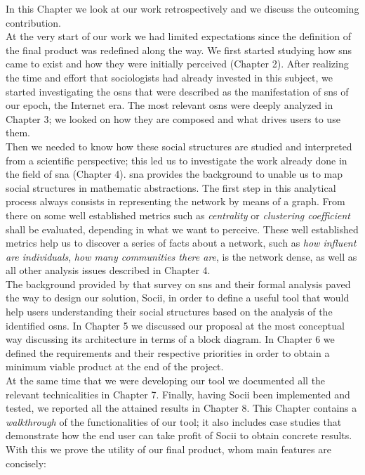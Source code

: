In this Chapter we look at our work retrospectively and we discuss the outcoming contribution.\\
\indent At the very start of our work we had limited expectations since the definition of the final product was redefined along the way. We first started studying how \glspl{sn} came to exist and how they were initially perceived (Chapter 2). After realizing the time and effort that sociologists had already invested in this subject, we started investigating the \glspl{osn} that were described as the manifestation of \glspl{sn} of our epoch, the Internet era. The most relevant \glspl{osn} were deeply analyzed in Chapter 3; we looked on how they are composed and what drives users to use them.\\
\indent Then we needed to know how these social structures are studied and interpreted from a scientific perspective; this led us to investigate the work already done in the field of \gls{sna} (Chapter 4). \gls{sna} provides the background to unable us to map social structures in mathematic abstractions. The first step in this analytical process always consists in representing the network by means of a graph. From there on some well established metrics such as \emph{centrality} or \emph{clustering coefficient} shall be evaluated, depending in what we want to perceive. These well established metrics help us to discover a series of facts about a network, such as \emph{how influent are individuals}, \emph{how many communities there are}, is the network dense, as well as all other analysis issues described in Chapter 4.\\
\indent The background provided by that survey on \glspl{sn} and their formal analysis paved the way to design our solution, Socii, in order to define a useful tool that would help users understanding their social structures based on the analysis of the identified \glspl{osn}. In Chapter 5 we discussed our proposal at the most conceptual way discussing its architecture in terms of a block diagram. In Chapter 6 we defined the requirements and their respective priorities in order to obtain a minimum viable product at the end of the project.\\
\indent At the same time that we were developing our tool we documented all the relevant technicalities in Chapter 7. Finally, having Socii been implemented and tested, we reported all the attained results in Chapter 8. This Chapter contains a \textit{walkthrough} of the functionalities of our tool; it also includes case studies that demonstrate how the end user can take profit of Socii to obtain concrete results. With this we prove the utility of our final product, whom main features are concisely:
